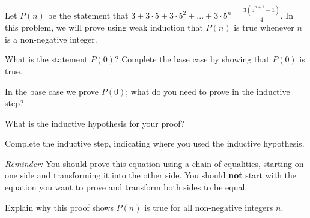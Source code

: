 \documentclass[12pt]{exam}
\begin{document}
 Let $P(n)$ be the statement that $3 + 3 \cdot 5 + 3 \cdot 5^2 + ... + 3 \cdot 5^n = \frac{3 (5^{n+1} - 1)}{4}$. In this problem, we will prove using weak induction that $P(n)$ is true whenever $n$ is a non-negative integer.
\begin{parts}
    \item What is the statement $P(0)$? Complete the base case by showing that $P(0)$ is true.
    \item In the base case we prove $P(0)$; what do you need to prove in the inductive step?
    \item What is the inductive hypothesis for your proof?
    \item Complete the inductive step, indicating where you used the inductive hypothesis.
    
    \textit{Reminder:} You should prove this equation using a chain of equalities, starting on one side and transforming it into the other side.  You should \textbf{not} start with the equation you want to prove and transform both sides to be equal.
    \item Explain why this proof shows $P(n)$ is true for all non-negative integers $n$.
\end{parts}
\end{document}
